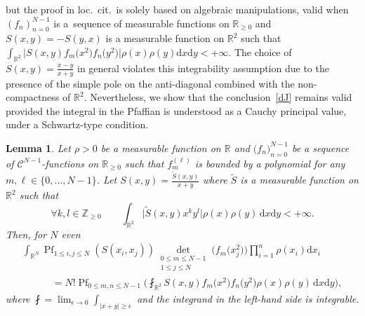 \documentclass[11pt]{article}
\numberwithin{equation}{section}
\numberwithin{equation}{section}
\newcommand{\dd}{\mathrm{d}}
\newtheorem{Lemma}[Theorem]{Lemma}
\begin{document}
but the proof in loc.\ cit.\ is solely based on algebraic manipulations, valid when $(f_n)_{n = 0}^{N - 1}$ is a~sequence of measurable functions on $\mathbb{R}_{\geq 0}$ and $S(x,y) = -S(y,x)$ is a measurable function on $\mathbb{R}^2$ such that $\int_{\mathbb{R}^2} \big|S(x,y)f_m\bigl(x^2\bigr)f_n\bigl(y^2\bigr)\big|\rho(x)\rho(y)\dd x\dd y < +\infty$. The choice of $S(x,y) = \frac{x - y}{x + y}$ in general violates this integrability assumption due to the presence of the simple pole on the anti-diagonal combined with the non-compactness of $\mathbb{R}^2$. Nevertheless, we show that the conclusion~\eqref{dJ} remains valid provided the integral in the Pfaffian is understood as a Cauchy principal value, under a Schwartz-type condition.

\begin{Lemma}
\label{HUHH}Let $\rho > 0$ be a measurable function on $\mathbb{R}$ and $\mathbb(f_n)_{n = 0}^{N - 1}$ be a sequence of $\mathcal{C}^{N - 1}$-functions on $\mathbb{R}_{\geq 0}$ such that $f^{(\ell)}_m$ is bounded by a polynomial for any $m,\ell \in \{0,\dots,N - 1\}$. Let $S(x,y) = \frac{\tilde{S}(x,y)}{x + y}$ where $\tilde{S}$ is a measurable function on $\mathbb{R}^2$ such that
\[
\forall k,l \in \mathbb{Z}_{\geq 0}\qquad \int_{\mathbb{R}^2} \bigl|\tilde{S}(x,y)x^ky^l\bigr|\rho(x)\rho(y)\,\dd x \dd y < +\infty.
\]
Then, for $N$ even
\begin{gather*}
 \int_{\mathbb{R}^N} \operatorname{Pf}_{1 \leq i,j \leq N} (S(x_i,x_j)) \mathop{\det}_{\substack{0 \leq m \leq N - 1 \\
 1 \leq j \leq N}} \bigl(f_m\bigl(x_j^2\bigr)\bigr) \prod_{i = 1}^n \rho(x_i)\dd x_i \\
\qquad\quad{} = N!\operatorname{Pf}_{0 \leq m,n \leq N - 1}\biggl(\fint_{\mathbb{R}^2} S(x,y) f_m\bigl(x^2\bigr) f_n\bigl(y^2\bigr)\rho(x)\rho(y)\,\dd x \dd y\biggr),
\end{gather*}
where $\fint = \lim_{\epsilon \rightarrow 0} \int_{|x + y| \geq \epsilon}$ and the integrand in the left-hand side is integrable.
\end{Lemma}
\end{document}
